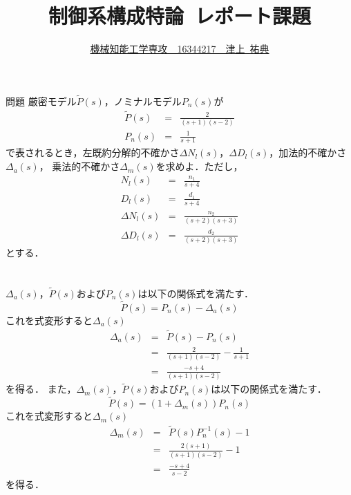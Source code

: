 \documentclass[a4paper,12pt]{jarticle}
\begin{document}
%
\title{\vspace{-30mm} 制御系構成特論~レポート課題}
\author{\underline{機械知能工学専攻~~16344217~~津上~祐典}}
\date{}
%
\maketitle
%
\vspace{-25mm}
%


\begin{itembox}[l]{\Large{問題}}
 厳密モデル$\tilde{P}(s)$，ノミナルモデル$P_n(s)$が
%
\begin{eqnarray}
 \tilde{P}(s)&=&\frac{2}{(s+1)(s-2)} \\
 P_n(s)&=&\frac{1}{s+1}
\end{eqnarray}
%
で表されるとき，左既約分解的不確かさ$\Delta N_l(s)$，$\Delta D_l(s)$，加法的不確かさ$\Delta_a(s)$，
 乗法的不確かさ$\Delta_m(s)$を求めよ．ただし，
%
 \begin{eqnarray}
N_l(s)&=&\frac{n_1}{s+4} \\
D_l(s)&=&\frac{d_1}{s+4} \\
  \Delta N_l(s)&=&\frac{n_2}{(s+2)(s+3)} \\
  \Delta D_l(s)&=&\frac{d_2}{(s+2)(s+3)}
 \end{eqnarray}
 とする．
\end{itembox}

\vspace{-10mm}
\section*{}
$\Delta_a(s)$，$\tilde{P}(s)$および$P_n(s)$は以下の関係式を満たす．
%
\begin{equation}
 \tilde{P}(s)=P_n(s)-\Delta_a(s)
\end{equation}
%
これを式変形すると$\Delta_a(s)$
%
\begin{eqnarray}
 \Delta_a(s) &=& \tilde{P}(s)-P_n(s) \nonumber \\
  &=& \frac{2}{(s+1)(s-2)}-\frac{1}{s+1} \nonumber \\
 &=& \frac{-s+4}{(s+1)(s-2)} 
\end{eqnarray}
%
を得る．
%
また，$\Delta_m(s)$，$\tilde{P}(s)$および$P_n(s)$は以下の関係式を満たす．
%
\begin{equation}
\tilde{P}(s) = (1+\Delta_m(s))P_n(s) 
\end{equation}
%
これを式変形すると$\Delta_m(s)$
%
\begin{eqnarray}
 \Delta_m(s) &=& \tilde{P}(s)P_n^{-1}(s)-1 \\
 &=&\frac{2(s+1)}{(s+1)(s-2)}-1 \\
 &=&\frac{-s+4}{s-2}
\end{eqnarray}
%
を得る．
\end{document}
